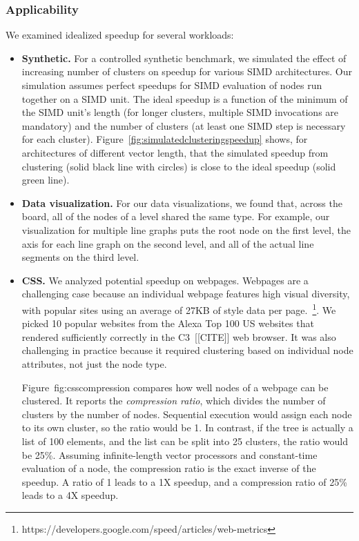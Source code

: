 \subsubsection{Applicability}


We examined idealized speedup for several workloads:

\begin{itemize}

\item \textbf{Synthetic.} For a controlled synthetic benchmark, we simulated the effect of increasing number of clusters on speedup for various SIMD architectures.  Our simulation assumes perfect speedups for SIMD evaluation of nodes run together on a SIMD unit. The ideal speedup is a function of the minimum of the SIMD unit's length (for longer clusters, multiple SIMD invocations are mandatory) and the number of clusters (at least one SIMD step is necessary for each cluster).   Figure~\ref{fig:simulatedclusteringspeedup} shows, for architectures of different vector length, that the simulated speedup from clustering (solid black line with circles) is close to the ideal speedup (solid green line).

\item \textbf{Data visualization.} For our data visualizations, we found that, across the board, all of the nodes of a level shared the same type. For example, our visualization for multiple line graphs puts the root node on the first level, the axis for each line graph on the second level, and all of the actual line segments on the third level. 

\item \textbf{CSS.} We analyzed potential speedup on webpages. Webpages are a challenging case because an individual webpage features high visual diversity, with popular sites using an average of 27KB of style data per page.~\footnote{https://developers.google.com/speed/articles/web-metrics}. We picked 10 popular websites from the Alexa Top 100 US websites that rendered sufficiently correctly in the C3~[[CITE]] web browser. It was also challenging in practice because it required clustering based on individual node attributes, not just the node type.

Figure~{fig:csscompression} compares how well nodes of a webpage can be clustered. It reports the \emph{compression ratio}, which divides the number of clusters by the number of nodes. Sequential execution would assign each node to its own cluster, so the ratio would be 1. In contrast, if the tree is actually a list of 100 elements, and the list can be split into 25 clusters, the ratio would be 25\%. Assuming infinite-length vector processors and constant-time evaluation of a node, the compression ratio is the exact inverse of the speedup. A ratio of 1 leads to a 1X speedup, and a compression ratio of 25\% leads to a 4X speedup.


\end{itemize}

